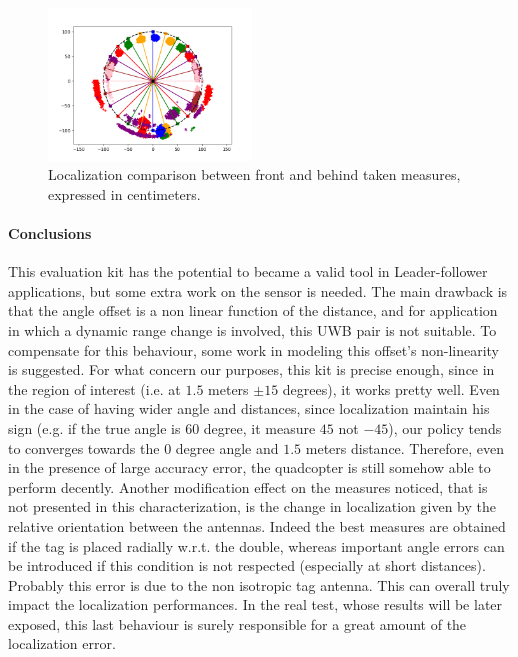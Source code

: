 \begin{figure}
    \centering
    \includegraphics[width=0.48\textwidth]{images/characterization/ch9_behind_measure.png}
    \caption{Localization comparison between front and behind taken measures, expressed in centimeters.}
    \label{UWB:fig:ch9_behind}
\end{figure}

\paragraph{Conclusions}\label{UWB:conclus}
This evaluation kit has the potential to became a valid tool in Leader-follower applications, but some extra work on the sensor is needed. The main drawback is that the angle offset is a non linear function of the distance, and for application in which a dynamic range change is involved, this UWB pair is not suitable. To compensate for this behaviour, some work in modeling this offset's non-linearity is suggested. For what concern our purposes, this kit is precise enough, since in the region of interest (i.e. at $1.5$ meters $\pm 15$ degrees), it works pretty well. Even in the case of having wider angle and distances, since localization maintain his sign (e.g. if the true angle is $60$ degree, it measure $45$ not $-45$), our policy tends to converges towards the $0$ degree angle and $1.5$ meters distance. Therefore, even in the presence of large accuracy error, the quadcopter is still somehow able to perform decently. Another modification effect on the measures noticed, that is not presented in this characterization, is the change in localization given by the relative orientation between the antennas. Indeed the best measures are obtained if the tag is placed radially w.r.t. the double, whereas important angle errors can be introduced if this condition is not respected (especially at short distances). Probably this error is due to the non isotropic tag antenna. This can overall truly impact the localization performances. In the real test, whose results will be later exposed, this last behaviour is surely responsible for a great amount of the localization error.